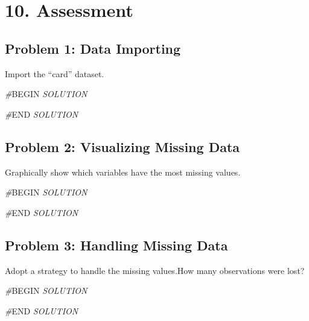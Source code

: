 \documentclass[
]{article}
\newenvironment{Shaded}{\begin{snugshade}}{\end{snugshade}}
\newcommand{\CommentTok}[1]{\textcolor[rgb]{0.56,0.35,0.01}{\textit{#1}}}
\newcommand{\RegionMarkerTok}[1]{#1}
\begin{document}
\hypertarget{assessment}{%
\section{10. Assessment}\label{assessment}}

\hypertarget{problem-1-data-importing}{%
\subsection{Problem 1: Data Importing}\label{problem-1-data-importing}}

Import the ``card'' dataset.

\begin{Shaded}
\begin{Highlighting}[]
\CommentTok{\#}\RegionMarkerTok{BEGIN}\CommentTok{ SOLUTION}

\CommentTok{\#}\RegionMarkerTok{END}\CommentTok{ SOLUTION}
\end{Highlighting}
\end{Shaded}

\hypertarget{problem-2-visualizing-missing-data}{%
\subsection{Problem 2: Visualizing Missing
Data}\label{problem-2-visualizing-missing-data}}

Graphically show which variables have the most missing values.

\begin{Shaded}
\begin{Highlighting}[]
\CommentTok{\#}\RegionMarkerTok{BEGIN}\CommentTok{ SOLUTION}

\CommentTok{\#}\RegionMarkerTok{END}\CommentTok{ SOLUTION}
\end{Highlighting}
\end{Shaded}

\hypertarget{problem-3-handling-missing-data}{%
\subsection{Problem 3: Handling Missing
Data}\label{problem-3-handling-missing-data}}

Adopt a strategy to handle the missing values.How many observations were
lost?

\begin{Shaded}
\begin{Highlighting}[]
\CommentTok{\#}\RegionMarkerTok{BEGIN}\CommentTok{ SOLUTION}

\CommentTok{\#}\RegionMarkerTok{END}\CommentTok{ SOLUTION}
\end{Highlighting}
\end{Shaded}
\end{document}
